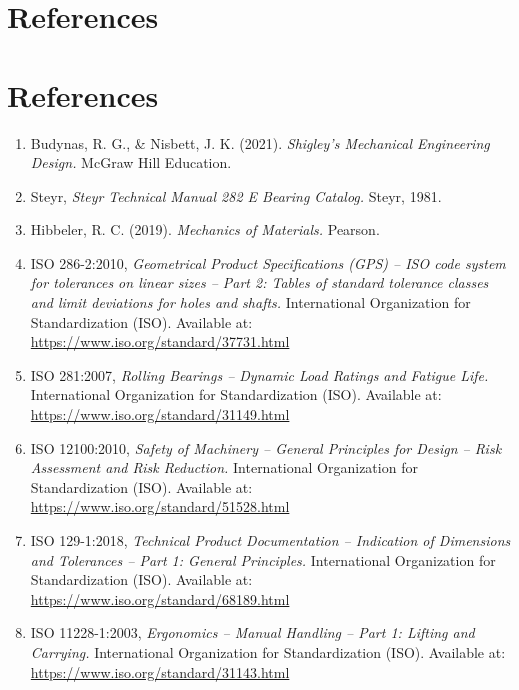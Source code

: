 \documentclass[12pt]{article}
\begin{document}
\section{References}

\section*{References}

\begin{enumerate}

    \item Budynas, R. G., \& Nisbett, J. K. (2021). \textit{Shigley’s Mechanical Engineering Design.} McGraw Hill Education.

    \item Steyr, \textit{Steyr Technical Manual 282 E Bearing Catalog.} Steyr, 1981.

    \item Hibbeler, R. C. (2019). 
    \textit{Mechanics of Materials.} Pearson.
    
    \item ISO 286-2:2010, \textit{Geometrical Product Specifications (GPS) – ISO code system for tolerances on linear sizes – Part 2: Tables of standard tolerance classes and limit deviations for holes and shafts.} International Organization for Standardization (ISO). Available at: \url{https://www.iso.org/standard/37731.html}

    \item ISO 281:2007, \textit{Rolling Bearings – Dynamic Load Ratings and Fatigue Life.} International Organization for Standardization (ISO). Available at: \url{https://www.iso.org/standard/31149.html}

    \item ISO 12100:2010, \textit{Safety of Machinery – General Principles for Design – Risk Assessment and Risk Reduction.} International Organization for Standardization (ISO). Available at: \url{https://www.iso.org/standard/51528.html}

    \item ISO 129-1:2018, \textit{Technical Product Documentation – Indication of Dimensions and Tolerances – Part 1: General Principles.} International Organization for Standardization (ISO). Available at: \url{https://www.iso.org/standard/68189.html}

    \item ISO 11228-1:2003, \textit{Ergonomics – Manual Handling – Part 1: Lifting and Carrying.} International Organization for Standardization (ISO). Available at: \url{https://www.iso.org/standard/31143.html}


\end{enumerate}
\end{document}
